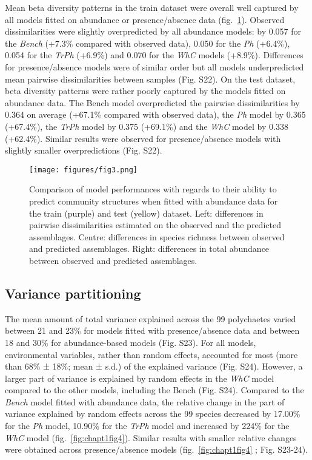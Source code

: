 \documentclass[9pt,biorxiv,doublespacing,lineno]{lapreprint}
\begin{document}
Mean beta diversity patterns in the train dataset were overall well
captured by all models fitted on abundance or presence/absence data
(fig.~\ref{fig:chapt1fig3}). Observed dissimilarities were slightly
overpredicted by all abundance models: by 0.057 for the \emph{Bench}
(+7.3\% compared with observed data), 0.050 for the \emph{Ph} (+6.4\%),
0.054 for the \emph{TrPh} (+6.9\%) and 0.070 for the \emph{WhC} models
(+8.9\%). Differences for presence/absence models were of similar order
but all models underpredicted mean pairwise dissimilarities between
samples (Fig. S22). On the test dataset, beta diversity patterns were
rather poorly captured by the models fitted on abundance data. The Bench
model overpredicted the pairwise dissimilarities by 0.364 on average
(+67.1\% compared with observed data), the \emph{Ph} model by 0.365
(+67.4\%), the \emph{TrPh} model by 0.375 (+69.1\%) and the \emph{WhC}
model by 0.338 (+62.4\%). Similar results were observed for
presence/absence models with slightly smaller overpredictions (Fig.
S22).

\begin{figure}
\hypertarget{fig:chapt1fig3}{%
\centering
\texttt{[image: figures/fig3.png]}
\caption{Comparison of model performances with regards to their ability
to predict community structures when fitted with abundance data for the
train (purple) and test (yellow) dataset. Left: differences in pairwise
dissimilarities estimated on the observed and the predicted assemblages.
Centre: differences in species richness between observed and predicted
assemblages. Right: differences in total abundance between observed and
predicted assemblages.}\label{fig:chapt1fig3}
}
\end{figure}

\hypertarget{variance-partitioning}{%
\subsection{Variance partitioning}\label{variance-partitioning}}

The mean amount of total variance explained across the 99 polychaetes
varied between 21 and 23\% for models fitted with presence/absence data
and between 18 and 30\% for abundance-based models (Fig. S23). For all
models, environmental variables, rather than random effects, accounted
for most (more than 68\% ± 18\%; mean ± s.d.) of the explained variance
(Fig. S24). However, a larger part of variance is explained by random
effects in the \emph{WhC} model compared to the other models, including
the Bench (Fig. S24). Compared to the \emph{Bench} model fitted with
abundance data, the relative change in the part of variance explained by
random effects across the 99 species decreased by 17.00\% for the
\emph{Ph} model, 10.90\% for the \emph{TrPh} model and increased by
224\% for the \emph{WhC} model (fig.~\ref{fig:chapt1fig4}). Similar
results with smaller relative changes were obtained across
presence/absence models (fig.~\ref{fig:chapt1fig4} ; Fig. S23-24).
\end{document}
